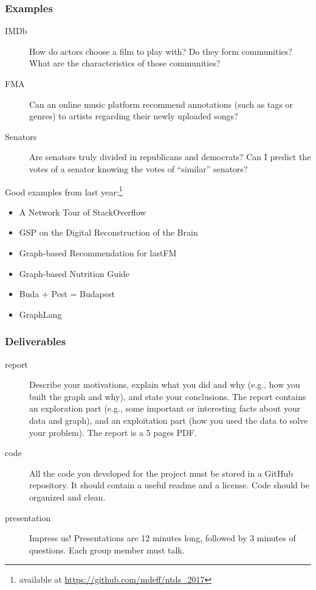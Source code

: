 \documentclass[aspectratio=169]{beamer}
\begin{document}
\begin{frame}
	\frametitle{Examples}
	\begin{description}
		\item[IMDb] How do actors choose a film to play with? Do they form communities? What are the characteristics of those communities?
		\item[FMA] Can an online music platform recommend annotations (such as tags or genres) to artists regarding their newly uploaded songs?
		\item[Senators] Are senators truly divided in republicans and democrats? Can I predict the votes of a senator knowing the votes of ``similar'' senators?
	\end{description}
	\vfill
	Good examples from last year:\footnote{available at \url{https://github.com/mdeff/ntds_2017}}
	\vfill
	\begin{minipage}{0.60\linewidth}
		\begin{itemize}
			\item A Network Tour of StackOverflow
			\item GSP on the Digital Reconstruction of the Brain
			\item Graph-based Recommendation for lastFM
		\end{itemize}
	\end{minipage}
	\hfill
	\begin{minipage}{0.39\linewidth}
		\begin{itemize}
			\item Graph-based Nutrition Guide
			\item Buda + Pest = Budapest
			\item GraphLang
		\end{itemize}
	\end{minipage}
\end{frame}


\begin{frame}
	\frametitle{Deliverables}
	\begin{description}
		\item [report] Describe your motivations, explain what you did and why (e.g., how you built the graph and why), and state your conclusions. The report contains an exploration part (e.g., some important or interesting facts about your data and graph), and an exploitation part (how you used the data to solve your problem). The report is a 5 pages PDF.
		\vfill
		\item [code] All the code you developed for the project must be stored in a GitHub repository. It should contain a useful readme and a license. Code should be organized and clean.
		\vfill
		\item [presentation] Impress us! Presentations are 12 minutes long, followed by 3 minutes of questions. Each group member must talk.
	\end{description}
\end{frame}
\end{document}
